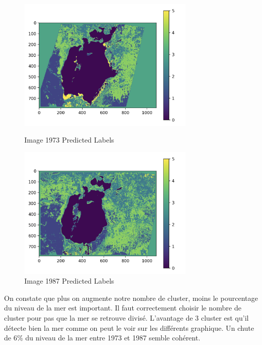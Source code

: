 \begin{figure}[!h]
    \begin{minipage}{.48\linewidth}
        \begin{center}
            \includegraphics[width=0.75\textwidth]{./img/6.8.3.png}
                \caption{\label{fig:6.4.1}Image 1973 Predicted Labels}  
            \end{center}
    \end{minipage}\hfill
    \begin{minipage}{.48\linewidth}
        \begin{center}
            \includegraphics[width=0.75\textwidth]{./img/6.8.4.png}
            \caption{\label{fig:6.4.2}Image 1987 Predicted Labels}  
        \end{center}
    \end{minipage}
\end{figure}

On constate que plus on augmente notre nombre de cluster, moins le pourcentage du niveau de la mer est important. 
Il faut correctement choisir le nombre de cluster pour pas que la mer se retrouve divisé. L’avantage de 3 cluster est 
qu’il détecte bien la mer comme on peut le voir sur les différents graphique. Un chute de 6\% 
du niveau de la mer entre 1973 et 1987 semble cohérent.






















  









